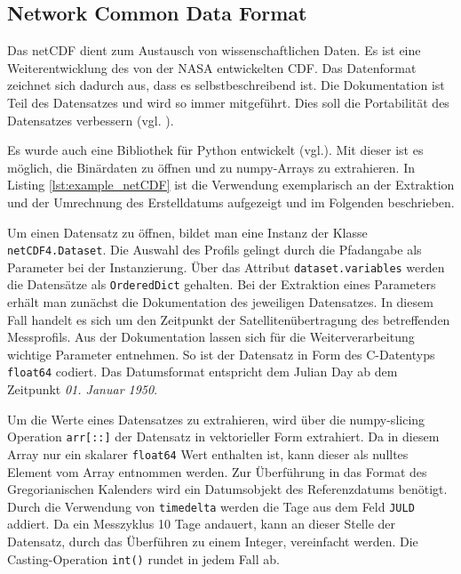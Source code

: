 
\pagebreak
    \subsection{Network Common Data Format}

    Das \gls{netCDF} dient zum Austausch von wissenschaftlichen Daten. Es ist eine Weiterentwicklung des von der NASA entwickelten \gls{CDF}. Das Datenformat zeichnet sich dadurch aus, dass es selbstbeschreibend ist. Die Dokumentation ist Teil des Datensatzes und wird so immer  mitgeführt. Dies soll die Portabilität des Datensatzes verbessern  (vgl. \cite{FishernetCDF}).

    Es wurde auch eine Bibliothek für Python entwickelt  (vgl.\cite{netCDF4}). Mit dieser ist es möglich, die Binärdaten zu öffnen und zu numpy-Arrays zu extrahieren. In Listing \ref{lst:example_netCDF} ist die Verwendung exemplarisch an der Extraktion und der Umrechnung des Erstelldatums  aufgezeigt und im Folgenden beschrieben.


    Um einen Datensatz zu öffnen, bildet man eine Instanz der Klasse \texttt{netCDF4.Dataset}. Die Auswahl des Profils gelingt durch die Pfadangabe als Parameter bei der Instanzierung.
    Über das Attribut \texttt{dataset.variables} werden die Datensätze als \texttt{OrderedDict} gehalten. Bei der Extraktion eines Parameters erhält man zunächst die Dokumentation des jeweiligen Datensatzes. In diesem Fall handelt es sich um den Zeitpunkt der Satellitenübertragung des betreffenden Messprofils.
    Aus der Dokumentation lassen sich für die Weiterverarbeitung wichtige Parameter entnehmen.
    So ist der Datensatz in Form des C-Datentyps \texttt{float64} codiert. Das Datumsformat entspricht dem \gls{Julian Day} ab dem Zeitpunkt \textit{01. Januar 1950}.

    Um die Werte eines Datensatzes zu extrahieren, wird über die numpy-slicing Operation \texttt{arr[::]} der Datensatz in vektorieller Form extrahiert. Da in diesem Array nur ein skalarer \texttt{float64} Wert enthalten ist, kann dieser als nulltes Element vom Array entnommen werden.
    Zur Überführung in das Format des Gregorianischen Kalenders wird ein Datumsobjekt des Referenzdatums benötigt. Durch die Verwendung von \texttt{timedelta} werden die Tage aus dem Feld \texttt{JULD} addiert. Da ein Messzyklus 10 Tage andauert, kann an dieser Stelle der Datensatz, durch das Überführen zu einem Integer, vereinfacht werden. Die Casting-Operation \texttt{int()} rundet in jedem Fall ab.

